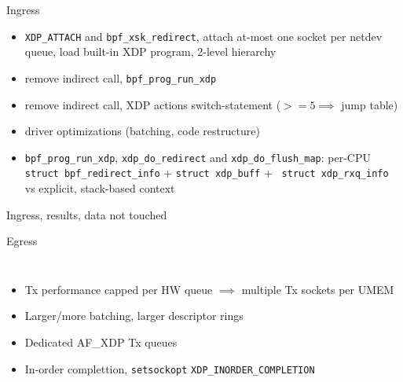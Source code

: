 \documentclass[aspectratio=169]{beamer}
\begin{document}
  \begin{frame}{Ingress}
      \begin{itemize}
        \item {\tt XDP\_ATTACH} and {\tt bpf\_xsk\_redirect}, attach
          at-most one socket per netdev queue, load built-in XDP
          program, 2-level hierarchy
        \item remove indirect call, {\tt bpf\_prog\_run\_xdp}
        \item remove indirect call, XDP actions switch-statement ($>=5
          \implies$ jump table)
        \item driver optimizations (batching, code restructure)
        \item {\tt bpf\_prog\_run\_xdp}, {\tt xdp\_do\_redirect} and
          {\tt xdp\_do\_flush\_map}: per-CPU {\tt struct
            bpf\_redirect\_info} + {\tt struct xdp\_buff} + {\tt
            struct xdp\_rxq\_info} vs explicit, stack-based context
      \end{itemize}
  \end{frame}
  \begin{frame}{Ingress, results, data not touched}
    \centering{}
  \end{frame}

  \begin{frame}{Egress}
  \begin{columns}[T,onlytextwidth]
    \begin{itemize}
    \item Tx performance capped per HW queue $\implies$ multiple Tx
      sockets per UMEM
    \item Larger/more batching, larger descriptor rings
    \item Dedicated AF\_XDP Tx queues
    \item In-order complettion, {\tt setsockopt} {\tt XDP\_INORDER\_COMPLETION}
    \end{itemize}
    \centering\resizebox{0.8\textwidth}{!}{}
    \end{columns}
  \end{frame}
\end{document}
